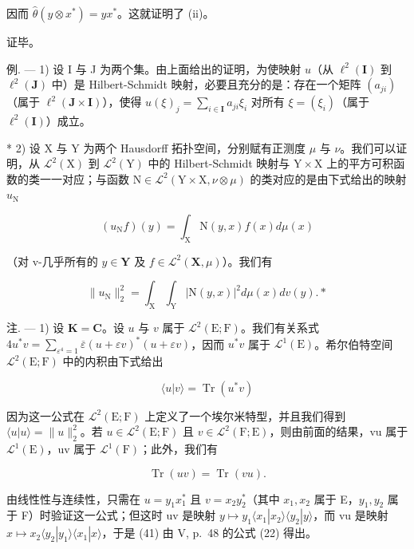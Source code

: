 因而 \(\hat{\theta}(y\otimes x^{*}) = yx^{*}\)。这就证明了 (ii)。

证毕。

例. --- 1) 设 I 与 J 为两个集。由上面给出的证明，为使映射 \(u\)（从 \(\ell^2(\mathbf{I})\) 到 \(\ell^2(\mathbf{J})\) 中）是 Hilbert-Schmidt 映射，必要且充分的是：存在一个矩阵 \((a_{ji})\)（属于 \(\ell^2(\mathbf{J} \times \mathbf{I})\)），使得 \(u(\xi)_j = \sum_{i \in \mathbf{I}} a_{ji} \xi_i\) 对所有 \(\xi = (\xi_i)\)（属于 \(\ell^2(\mathbf{I})\)）成立。

* 2) 设 X 与 Y 为两个 Hausdorff 拓扑空间，分别赋有正测度 \(\mu\) 与 \(\nu\)。我们可以证明，从 \(\mathcal{L}^2(\mathrm{X})\) 到 \(\mathcal{L}^2(\mathrm{Y})\) 中的 Hilbert-Schmidt 映射与 \(\mathrm{Y} \times \mathrm{X}\) 上的平方可积函数的类一一对应；与函数 \(\mathrm{N} \in \mathcal{L}^2(\mathrm{Y} \times \mathrm{X}, \nu \otimes \mu)\) 的类对应的是由下式给出的映射 \(u_{\mathrm{N}}\)

\[
(u _ {\mathrm{N}} f) (y) = \int_ {\mathrm{X}} \mathrm{N} (y, x) f (x) d \mu (x)\tag{38}
\]

（对 v-几乎所有的 \(y \in \mathbf{Y}\) 及 \(f \in \mathcal{L}^2(\mathbf{X}, \mu)\)）。我们有

\[
\| u _ {\mathrm{N}} \| _ {2} ^ {2} = \int_ {\mathrm{X}} \int_ {\mathrm{Y}} | \mathrm{N} (y, x) | ^ {2} d \mu (x) d v (y). *\tag{39}
\]

注. --- 1) 设 \(\mathbf{K} = \mathbf{C}\)。设 \(u\) 与 \(v\) 属于 \(\mathcal{L}^2(\mathrm{E};\mathrm{F})\)。我们有关系式 \(4u^{*}v = \sum_{\varepsilon^{4} = 1}\overline{\varepsilon} (u + \varepsilon v)^{*}(u + \varepsilon v)\)，因而 \(u^{*}v\) 属于 \(\mathcal{L}^1(\mathrm{E})\)。希尔伯特空间 \(\mathcal{L}^2(\mathrm{E};\mathrm{F})\) 中的内积由下式给出

\[
\langle u | v \rangle = \operatorname{Tr} (u ^ {*} v)\tag{40}
\]

因为这一公式在 \(\mathcal{L}^{2}(\mathrm{E};\mathrm{F})\) 上定义了一个埃尔米特型，并且我们得到 \(\langle u|u\rangle=\|u\|_{2}^{2}\)。若 \(u\in\mathcal{L}^{2}(\mathrm{E};\mathrm{F})\) 且 \(v\in\mathcal{L}^{2}(\mathrm{F};\mathrm{E})\)，则由前面的结果，vu 属于 \(\mathcal{L}^{1}(\mathrm{E})\)，uv 属于 \(\mathcal{L}^{1}(\mathrm{F})\)；此外，我们有

\[
\operatorname{Tr} (u v) = \operatorname{Tr} (v u).\tag{41}
\]

由线性性与连续性，只需在 \(u = y_{1}x_{1}^{*}\) 且 \(v = x_{2}y_{2}^{*}\)（其中 \(x_{1}, x_{2}\) 属于 E，\(y_{1}, y_{2}\) 属于 F）时验证这一公式；但这时 uv 是映射 \(y \mapsto y_{1} \langle x_{1}|x_{2} \rangle \langle y_{2}|y \rangle\)，而 vu 是映射 \(x \mapsto x_{2} \langle y_{2}|y_{1} \rangle \langle x_{1}|x \rangle\)，于是 (41) 由 V, p.~48 的公式 (22) 得出。

